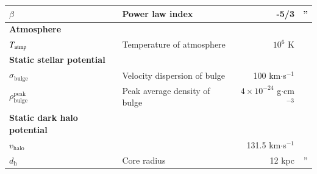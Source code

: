 \documentclass[twocolumn]{aastex631}
\begin{document}
\begin{table}[t]
\begin{tabular}{@{}llrc@{}}
$\beta$                                               & Power law index                           & -5/3                                 & \multicolumn{1}{c}{''}          \\ \hline
{\bf Atmosphere }                                     &                                           &                                      &                                 \\
$T_{\text{\text{atmp}}}$                              & Temperature of atmosphere                 & $10^{6}$ K                           & \citet{temperature-MW}          \\ \hline
{\bf Static stellar potential }                       &                                           &                                      &                                 \\
$\sigma_{\text{bulge}}$                               & Velocity dispersion of bulge              & 100 km$\cdot$s$^{-1}$                & \citet{velocity-dispersion-MW}  \\
$\rho_{\text{bulge}}^{\text{peak}}$                   & Peak average density of bulge             & $4\times 10^{-24}$ g$\cdot$cm$^{-3}$ &                                 \\ \hline
{\bf Static dark halo potential }                     &                                           &                                      &                                 \\
$v_{\text{halo}}$                                     &                                           & 131.5 km$\cdot$s$^{-1}$              & \citet{Johnston1995}            \\
$d_{\text{h}}$                                        & Core radius                               & 12 kpc                               & \multicolumn{1}{c}{''}          \\ \midrule
\end{tabular}
\end{table}
\end{document}
